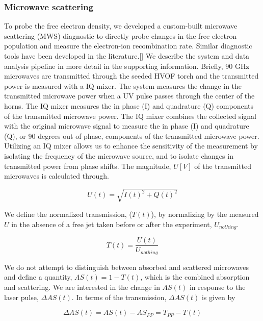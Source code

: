 \subsubsection{Microwave scattering}

To probe the free electron density, we developed a custom-built microwave scattering (MWS) diagnostic to directly probe changes in the free electron population and measure the electron-ion recombination rate. Similar diagnostic tools have been developed in the literature.[]  We describe the system and data analysis pipeline in more detail in the supporting information. Briefly, 90 GHz microwaves are transmitted through the seeded HVOF torch and the transmitted power is measured with a IQ mixer. The system measures the change in the transmitted microwave power when a UV pulse passes through the center of the horns.  The IQ mixer measures the in phase (I) and quadrature (Q) components of the transmitted microwave power. The IQ mixer combines the collected signal with the original microwave signal to measure the in phase (I) and quadrature (Q), or 90 degrees out of phase, components of the transmitted microwave power. Utilizing an IQ mixer allows us to enhance the sensitivity of the measurement by isolating the frequency of the microwave source, and to isolate changes in transmitted power from phase shifts. The magnitude, $U [V]$ of the transmitted microwaves is calculated through.

\begin{equation}
    U(t) = \sqrt{I(t)^2 + Q(t)^2}
\end{equation}

We define the normalized transmission, ($T(t)$), by normalizing by the measured $U$ in the absence of a free jet taken before or after the experiment, $U_{nothing}$. 

\begin{equation}
    \label{eq:transmission_def}
    T(t) = \frac{U(t)}{U_{nothing}}
\end{equation}

We do not attempt to distinguish between absorbed and scattered microwaves and define a quantity, $AS(t) = 1- T(t)$, which is the combined absorption and scattering. We are interested in the change in $AS(t)$ in response to the laser pulse, $\Delta AS(t)$. In terms of the transmission, $\Delta AS(t)$ is given by

\begin{equation}
    \Delta AS(t) = AS(t) - AS_{PP} =  T_{PP} - T(t)
\end{equation}

